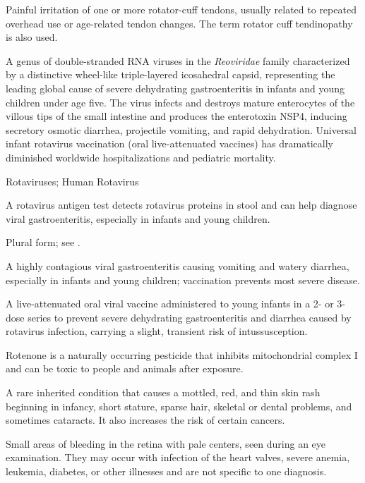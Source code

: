  Painful irritation of one or more rotator-cuff tendons, usually related to repeated overhead use or age-related tendon changes. The term rotator cuff tendinopathy is also used.

 A genus of double-stranded RNA viruses in the \textit{Reoviridae} family characterized by a distinctive wheel-like triple-layered icosahedral capsid, representing the leading global cause of severe dehydrating gastroenteritis in infants and young children under age five. The virus infects and destroys mature enterocytes of the villous tips of the small intestine and produces the enterotoxin NSP4, inducing secretory osmotic diarrhea, projectile vomiting, and rapid dehydration. Universal infant rotavirus vaccination (oral live-attenuated vaccines) has dramatically diminished worldwide hospitalizations and pediatric mortality.

\synonyms
Rotaviruses; Human Rotavirus

 A rotavirus antigen test detects rotavirus proteins in stool and can help diagnose viral gastroenteritis, especially in infants and young children.

 Plural form; see .

 A highly contagious viral gastroenteritis causing vomiting and watery diarrhea, especially in infants and young children; vaccination prevents most severe disease.

 A live-attenuated oral viral vaccine administered to young infants in a 2- or 3-dose series to prevent severe dehydrating gastroenteritis and diarrhea caused by rotavirus infection, carrying a slight, transient risk of intussusception.

 Rotenone is a naturally occurring pesticide that inhibits mitochondrial complex I and can be toxic to people and animals after exposure.

 A rare inherited condition that causes a mottled, red, and thin skin rash beginning in infancy, short stature, sparse hair, skeletal or dental problems, and sometimes cataracts. It also increases the risk of certain cancers.

 Small areas of bleeding in the retina with pale centers, seen during an eye examination. They may occur with infection of the heart valves, severe anemia, leukemia, diabetes, or other illnesses and are not specific to one diagnosis.

